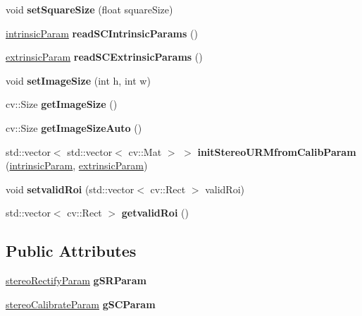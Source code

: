 \begin{DoxyCompactItemize}
void {\bfseries set\+Square\+Size} (float square\+Size)
\item 
\mbox{\label{classstereocalibration_a92edd3ef340a72a4fdeb7f9d4e66074d}} 
\mbox{\hyperlink{structintrinsic_param}{intrinsic\+Param}} {\bfseries read\+S\+C\+Intrinsic\+Params} ()
\item 
\mbox{\label{classstereocalibration_abd958e45ebb0cf334d4ad251f70ddbf8}} 
\mbox{\hyperlink{structextrinsic_param}{extrinsic\+Param}} {\bfseries read\+S\+C\+Extrinsic\+Params} ()
\item 
\mbox{\label{classstereocalibration_ac77aecb4887e10bc697e82449371d97f}} 
void {\bfseries set\+Image\+Size} (int h, int w)
\item 
\mbox{\label{classstereocalibration_a32cd7160b933edbfebc296ac235fc8e4}} 
cv\+::\+Size {\bfseries get\+Image\+Size} ()
\item 
\mbox{\label{classstereocalibration_aa2ebcdd8981f302aa92fb36b9ea67d1e}} 
cv\+::\+Size {\bfseries get\+Image\+Size\+Auto} ()
\item 
\mbox{\label{classstereocalibration_a232a4ec1a773ed67b8ca7f3cf901b38d}} 
std\+::vector$<$ std\+::vector$<$ cv\+::\+Mat $>$ $>$ {\bfseries init\+Stereo\+U\+R\+Mfrom\+Calib\+Param} (\mbox{\hyperlink{structintrinsic_param}{intrinsic\+Param}}, \mbox{\hyperlink{structextrinsic_param}{extrinsic\+Param}})
\item 
\mbox{\label{classstereocalibration_a1632a60ca43db38afc1a5c794ce050e8}} 
void {\bfseries setvalid\+Roi} (std\+::vector$<$ cv\+::\+Rect $>$ valid\+Roi)
\item 
\mbox{\label{classstereocalibration_a75e07889930798d7de9df6ac5c57378c}} 
std\+::vector$<$ cv\+::\+Rect $>$ {\bfseries getvalid\+Roi} ()
\end{DoxyCompactItemize}
\subsection*{Public Attributes}
\begin{DoxyCompactItemize}
\item 
\mbox{\label{classstereocalibration_a839900ecab29ae11694a40cc6d1c8a5a}} 
\mbox{\hyperlink{structstereo_rectify_param}{stereo\+Rectify\+Param}} {\bfseries g\+S\+R\+Param}
\item 
\mbox{\label{classstereocalibration_aa6e63956feeb64e1a26310bd4e8f356a}} 
\mbox{\hyperlink{structstereo_calibrate_param}{stereo\+Calibrate\+Param}} {\bfseries g\+S\+C\+Param}
\end{DoxyCompactItemize}


